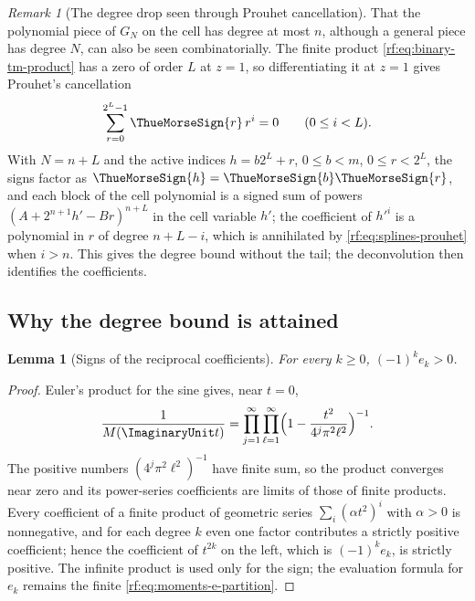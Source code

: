 \documentclass[11pt,oneside]{article}
\theoremstyle{plain}
\newtheorem{lemma}[theorem]{Lemma}
\theoremstyle{definition}
\theoremstyle{remark}
\newtheorem{remark}[theorem]{Remark}
\newcommand{\tm}[1]{\ThueMorseSign{#1}}     %
\begin{document}
\begin{remark}[The degree drop seen through Prouhet cancellation]
\label{rf:rmk:splines-prouhet}
That the polynomial piece of $G_{N}$ on the cell has degree at most $n$,
although a general piece has degree $N$, can also be seen combinatorially.
The finite product \cref{rf:eq:binary-tm-product} has a zero of order $L$
at $z=1$, so differentiating it at $z=1$ gives Prouhet's cancellation
\begin{equation}
 \sum_{r=0}^{2^{L}-1}\tm{r}\,r^{i}=0\qquad(0\le i<L).
 \label{rf:eq:splines-prouhet}
\end{equation}
With $N=n+L$ and the active indices $h=b2^{L}+r$, $0\le b<m$, $0\le r<2^{L}$,
the signs factor as $\tm{h}=\tm{b}\tm{r}$, and each block of the cell
polynomial is a signed sum of powers $(A+2^{n+1}h'-Br)^{n+L}$ in the cell
variable $h'$; the coefficient of $h'^{i}$ is a polynomial in $r$ of degree
$n+L-i$, which is annihilated by \cref{rf:eq:splines-prouhet} when $i>n$.
This gives the degree bound without the tail; the deconvolution then
identifies the coefficients.
\end{remark}

\subsection{Why the degree bound is attained}
\label{rf:sec:splines-degree}

\begin{lemma}[Signs of the reciprocal coefficients]
\label{rf:lem:splines-e-sign}
For every $k\ge0$, $(-1)^{k}e_{k}>0$.
\end{lemma}

\begin{proof}
Euler's product for the sine \cite[Eq.~4.22.1]{dlmf} gives, near $t=0$,
\begin{equation}
 \frac{1}{M(\ImaginaryUnit t)}
 =\prod_{j=1}^{\infty}\prod_{\ell=1}^{\infty}
 \Bigl(1-\frac{t^{2}}{4^{j}\pi^{2}\ell^{2}}\Bigr)^{-1}.
 \label{rf:eq:splines-euler-product}
\end{equation}
The positive numbers $(4^{j}\pi^{2}\ell^{2})^{-1}$ have finite sum, so the
product converges near zero and its power-series coefficients are limits of
those of finite products.  Every coefficient of a finite product of
geometric series $\sum_{i}(\alpha t^{2})^{i}$ with $\alpha>0$ is
nonnegative, and for each degree $k$ even one factor contributes a strictly
positive coefficient; hence the coefficient of $t^{2k}$ on the left, which
is $(-1)^{k}e_{k}$, is strictly positive.  The infinite product is used
only for the sign; the evaluation formula for $e_{k}$ remains the finite
\cref{rf:eq:moments-e-partition}.
\end{proof}
\end{document}
